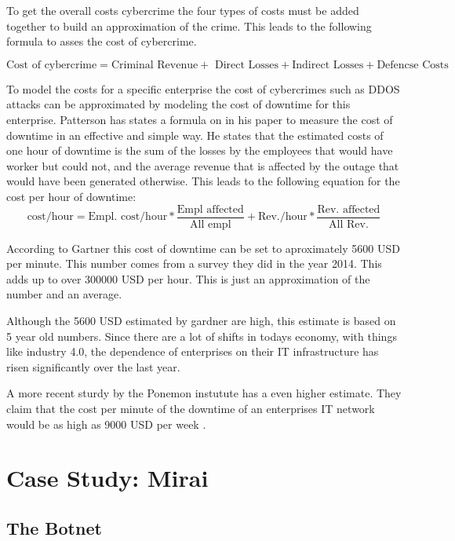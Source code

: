 To get the overall costs cybercrime the four types of costs must be added together to build an approximation of the crime. This leads to the following formula to asses the cost of cybercrime.

\begin{equation}
\text{Cost of cybercrime} = \text{Criminal Revenue} +\text{ Direct Losses} + \text{Indirect Losses} + \text{Defencse Costs}
\end{equation}

To model the costs for a specific enterprise the cost of cybercrimes such as DDOS attacks can be approximated by modeling the cost of downtime for this enterprise. 
Patterson has states a formula on in his paper to measure the cost of downtime in an effective and simple way. \cite{Patterson02} He states that the estimated costs of one hour of downtime is the sum of the losses by the employees that would have worker but could not, and the average revenue that is affected by the outage that would have been generated otherwise.
This leads to the following equation for the cost per hour of downtime: 
\begin{equation}
\text{cost/hour} = \text{Empl. cost/hour} * \frac{\text{Empl affected}}{\text{All empl}} + \text{Rev./hour} * \frac{\text{Rev. affected}}{\text{All Rev.}}
\end{equation}


According to Gartner \cite{Lerner14} this cost of downtime can be set to aproximately 5600 USD per minute. This number comes from a survey they did in the year 2014. This adds up to over 300000 USD per hour. This is just an approximation of the number and an average. 

Although the 5600 USD estimated by gardner are high, this estimate is based on 5 year old numbers. Since there are a lot of shifts in todays economy, with things like industry 4.0, the dependence of enterprises on their IT infrastructure has risen significantly over the last year. 

A more recent sturdy by the Ponemon instutute has a even higher estimate. They claim that the cost per minute of the downtime of an enterprises IT network would be as high as 9000 USD per week \cite{Ponemon16}.

		
\section{Case Study: Mirai}
	\subsection{The Botnet}

